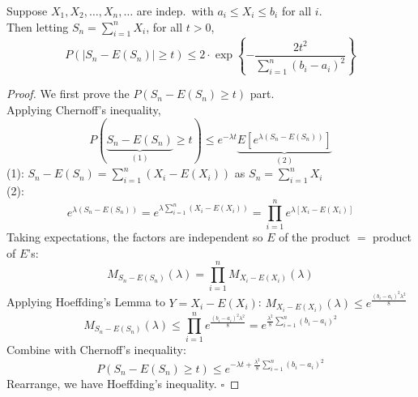 \begin{reqnoproof}
\begin{theorem}
    Suppose $X_1, X_2, \dots, X_n, \dots$ are indep.\ with $a_i \leq X_i \leq b_i$ for all $i$.
    \\ Then letting $S_n = \sum_{i=1}^n X_i$, for all $t > 0$,
    \[P(|S_n - E(S_n)| \geq t) \leq 2 \cdot \exp\left\{-\frac{2t^2}{\sum_{i=1}^n (b_i - a_i)^2}\right\}\]
    \begin{proof}
        We first prove the $P(S_n - E(S_n) \geq t)$ part.
        \\ Applying Chernoff's inequality,
        \[P(\underbrace{S_n - E(S_n)}_{(1)} \geq t) \leq e^{-\lambda t}\underbrace{E[e^{\lambda(S_n - E(S_n))}]}_{(2)}\]
        (1): \quad $S_n - E(S_n) = \sum_{i=1}^n (X_i - E(X_i))$ \quad as $S_n = \sum_{i=1}^n X_i$
        \\ (2): \[e^{\lambda(S_n - E(S_n))} = e^{\lambda\sum_{i=1}^n (X_i - E(X_i))} = \prod_{i=1}^n e^{\lambda[X_i - E(X_i)]}\]
        Taking expectations, the factors are independent so $E$ of the product $=$ product of $E$'s:
        \[M_{S_n - E(S_n)}(\lambda) = \prod_{i=1}^n M_{X_i - E(X_i)}(\lambda)\]
        Applying Hoeffding's Lemma to $Y = X_i - E(X_i)$: \quad $M_{X_i - E(X_i)}(\lambda) \leq e^{\frac{(b_i - a_i)^2\lambda^2}{8}}$
        \[M_{S_n - E(S_n)}(\lambda) \leq \prod_{i=1}^n e^{\frac{(b_i-a_i)^2\lambda^2}{8}} = e^{\frac{\lambda^2}{8}\sum_{i=1}^n (b_i - a_i)^2}\]
        Combine with Chernoff's inequality:
        \[P(S_n - E(S_n) \geq t) \leq e^{-\lambda t + \frac{\lambda^2}{8}\sum_{i=1}^n (b_i - a_i)^2}\]
        Rearrange, we have Hoeffding's inequality.
        \hfill $\square$
    \end{proof}
\end{theorem}
\end{reqnoproof}
